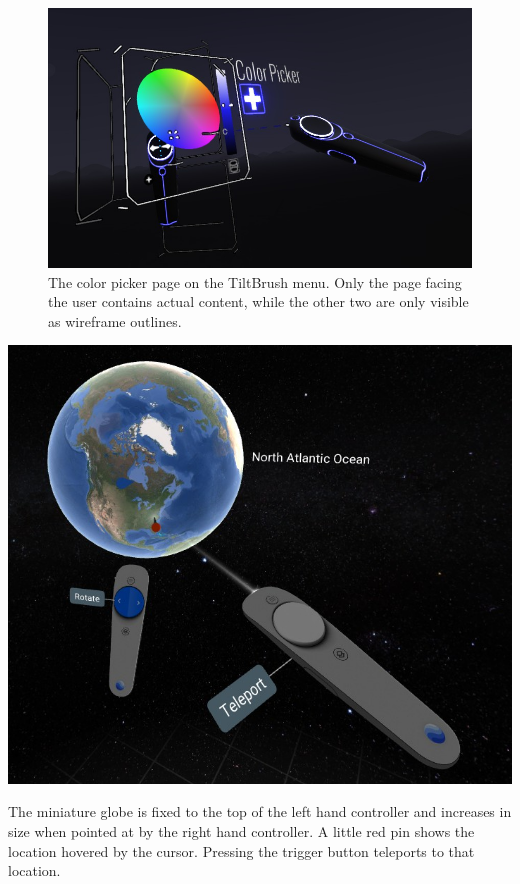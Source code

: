 \documentclass[nobib]{tufte-book} %
\begin{document}
\begin{figure}
  \includegraphics{tiltbrushmenu.png}
  \caption{The color picker page on the TiltBrush menu. Only the page facing the user contains actual content, while the other two are only visible as wireframe outlines.}
  \label{fig:tiltbrush}
\end{figure}

\begin{marginfigure}
  \includegraphics[width=\linewidth]{globe.png}
  \caption{The miniature globe is fixed to the top of the left hand controller and increases in size when pointed at by the right hand controller. A little red pin shows the location hovered by the cursor. Pressing the trigger button teleports to that location.}
  \label{fig:globe}
\end{marginfigure}
\end{document}
